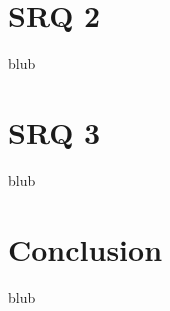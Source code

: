 \section{SRQ 2}

\label{SectionLiteratureReviewSRQ2}

blub




\section{SRQ 3}

\label{SectionLiteratureReviewSRQ3}

blub





\section{Conclusion}

\label{SectionLiteratureReviewConclusion}

blub

